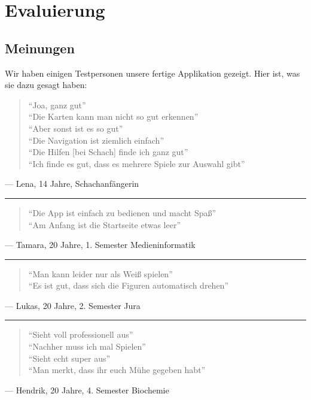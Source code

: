 \chapter{Evaluierung}

\section{Meinungen}

Wir haben einigen Testpersonen unsere fertige Applikation gezeigt. Hier ist, was
sie dazu gesagt haben:

\begin{quote}
``Joa, ganz gut'' \\
``Die Karten kann man nicht so gut erkennen'' \\
``Aber sonst ist es so gut'' \\
``Die Navigation ist ziemlich einfach'' \\
``Die Hilfen [bei Schach] finde ich ganz gut'' \\
``Ich finde es gut, dass es mehrere Spiele zur Auswahl gibt''
\end{quote}
--- Lena, 14 Jahre, Schachanfängerin

\hspace{8mm}\rule{.1\textwidth}{0.5pt}
\begin{quote}
``Die App ist einfach zu bedienen und macht Spaß'' \\
``Am Anfang ist die Startseite etwas leer''
\end{quote}
--- Tamara, 20 Jahre, 1. Semester Medieninformatik

\hspace{8mm}\rule{.1\textwidth}{0.5pt}
\begin{quote}
``Man kann leider nur als Weiß spielen'' \\
``Es ist gut, dass sich die Figuren automatisch drehen''
\end{quote}
--- Lukas, 20 Jahre, 2. Semester Jura

\hspace{8mm}\rule{.1\textwidth}{0.5pt}
\begin{quote}
``Sieht voll professionell aus'' \\
``Nachher muss ich mal Spielen'' \\
``Sieht echt super aus'' \\
``Man merkt, dass ihr euch Mühe gegeben habt''
\end{quote}
--- Hendrik, 20 Jahre, 4. Semester Biochemie

